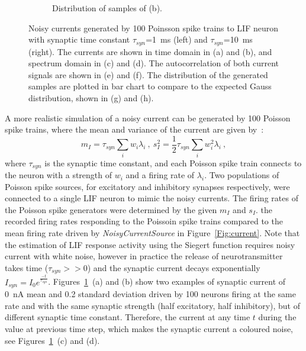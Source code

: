 \begin{figure}[tbp!]
\begin{subfigure}[t]{0.43\textwidth}
			\caption{Distribution of samples of (b).}
		\end{subfigure}
		\caption{Noisy currents generated by 100 Poinsson spike trains to \DIFdelbeginFL {}\DIFdelendFL \DIFaddbeginFL {}\DIFaddendFL LIF neuron with synaptic time constant $\tau_{syn}$=1~ms (left) and $\tau_{syn}$=10~ms (right). The currents are shown in \DIFaddbeginFL {}\DIFaddendFL time domain in (a) and (b), and \DIFaddbeginFL {}\DIFaddendFL spectrum domain in (c) and (d). The autocorrelation of both current signals are shown in (e) and (f). The distribution of the generated samples are plotted in bar chart \DIFaddbeginFL {}\DIFaddendFL to compare to the expected Gauss distribution, shown in (g) and (h).}
		\label{Fig:lif_pois}
	\end{figure}

	A more realistic simulation of a noisy current can be generated by 100 Poisson spike trains, 
	where the mean and variance of the current are given by~\citep{la2008response}:
	\begin{equation}
	m_I = \tau_{syn}\sum_i w_i\lambda_{i}~, ~s_I^2=\frac{1}{2}\tau_{syn}\sum_i w_i^2\lambda_{i}~,
	\label{equ:distr0}
	\end{equation}
	where $\tau_{syn}$ is the synaptic time constant, and each Poisson spike train connects to the neuron with a strength of $w_i$ and a firing rate of $\lambda_i$.
	Two populations of Poisson spike sources, for excitatory and inhibitory synapses respectively, were connected to a single LIF neuron to mimic the noisy currents.
	The firing rates of the Poisson spike generators were determined by the given $m_I$ and $s_I$.
	\DIFdelbegin {}\DIFdelend \DIFaddbegin {}\DIFaddend the recorded firing rates responding to the Poissoin spike trains compared to the mean firing rate driven by \textit{NoisyCurrentSource} in Figure~\ref{Fig:current}.
	Note that the estimation of LIF response activity using the Siegert function requires noisy current with white noise, however
	in practice the release of neurotransmitter takes time ($\tau_{syn} >> 0$) and the synaptic current decays exponentially $I_{syn} = I_0 e^{\frac{-t}{\tau_{syn}}}$.
	Figures~\ref{Fig:lif_pois}~(a) and (b) show two examples of synaptic current of 0~nA mean and 0.2 standard deviation driven by 100 neurons firing at the same rate and with the same synaptic strength (half excitatory, half inhibitory), but of different synaptic time constant.
	Therefore, the current at any time $t$ during \DIFdelbegin {}\DIFdelend \DIFaddbegin {}\DIFaddend the value at \DIFaddbegin {}\DIFaddend previous time step, which makes the synaptic current a coloured noise, see Figures~\ref{Fig:lif_pois}~(c) and (d).

